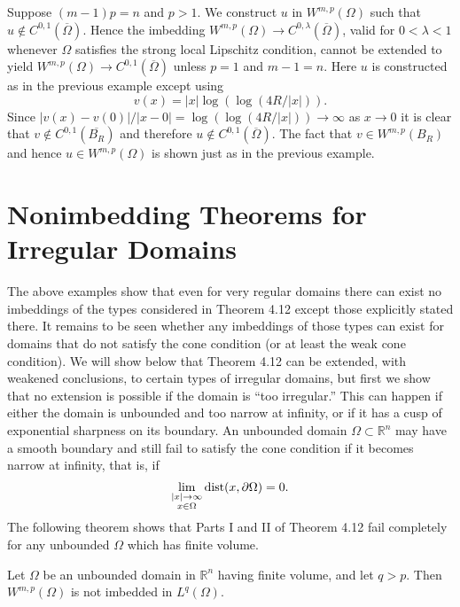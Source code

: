 \begin{example}
  Suppose $(m-1) p=n$ and $p>1$. We construct $u$ in $W^{m,p}(\Omega)$ such that $u \notin C^{0,1}(\overline{\Omega})$. Hence the imbedding $W^{m,p}(\Omega) \rightarrow C^{0, \lambda}(\overline{\Omega})$, valid for $0<\lambda<1$ whenever $\Omega$ satisfies the strong local Lipschitz condition,
  cannot be extended to yield $W^{m,p}(\Omega) \rightarrow C^{0,1}(\overline{\Omega})$ unless $p=1$ and $m-1=n$. Here $u$ is constructed as in the previous example except using
  \[
  v(x)=|x| \log (\log (4 R /|x|)) .
  \]
  Since $|v(x)-v(0)| /|x-0|=\log (\log (4 R /|x|)) \rightarrow \infty$ as $x \rightarrow 0$ it is clear that $v \notin C^{0,1}\left(\overline{B_R}\right)$ and therefore $u \notin C^{0,1}(\overline{\Omega})$. The fact that $v \in W^{m, p}\left(B_R\right)$ and hence $u \in W^{m, p}(\Omega)$ is shown just as in the previous example.
\end{example}


\section{Nonimbedding Theorems for Irregular Domains}

\begin{para}
  The above examples show that even for very regular domains there can exist no imbeddings of the types considered in Theorem 4.12 except those explicitly stated there. It remains to be seen whether any imbeddings of those types can exist for domains that do not satisfy the cone condition (or at least the weak cone condition). We will show below that Theorem 4.12 can be extended, with weakened conclusions, to certain types of irregular domains, but first we show that no extension is possible if the domain is ``too irregular.'' This can happen if either the domain is unbounded and too narrow at infinity, or if it has a cusp of exponential sharpness on its boundary.
  An unbounded domain $\Omega \subset \mathbb{R}^n$ may have a smooth boundary and still fail to satisfy the cone condition if it becomes narrow at infinity, that is, if
  \[
  \lim _{\substack{|x| \rightarrow \infty \\ x \in \Omega}} \operatorname{dist}(x, \partial \Omega)=0 .
  \]
  The following theorem shows that Parts I and II of Theorem 4.12 fail completely for any unbounded $\Omega$ which has finite volume.
\end{para}


\begin{theorem}
  Let $\Omega$ be an unbounded domain in $\mathbb{R}^n$ having finite volume, and let $q>p$. Then $W^{m,p}(\Omega)$ is not imbedded in $L^q(\Omega)$.
\end{theorem}

